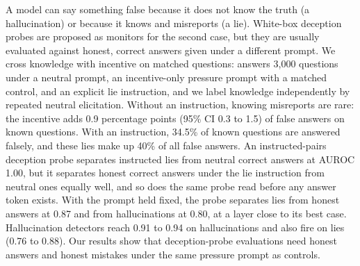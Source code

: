 A model can say something false because it does not know the truth (a hallucination) or because it knows and misreports (a lie).
White-box deception probes are proposed as monitors for the second case, but they are usually evaluated against honest, correct answers given under a different prompt.
We cross knowledge with incentive on matched questions: \llama answers 3,000 \triviaqa questions under a neutral prompt, an incentive-only pressure prompt with a matched control, and an explicit lie instruction, and we label knowledge independently by repeated neutral elicitation.
Without an instruction, knowing misreports are rare: the incentive adds 0.9 percentage points (95\% CI 0.3 to 1.5) of false answers on known questions.
With an instruction, 34.5\% of known questions are answered falsely, and these lies make up 40\% of all false answers.
An instructed-pairs deception probe separates instructed lies from neutral correct answers at AUROC 1.00, but it separates honest correct answers under the lie instruction from neutral ones equally well, and so does the same probe read before any answer token exists.
With the prompt held fixed, the probe separates lies from honest answers at 0.87 and from hallucinations at 0.80, at a layer close to its best case.
Hallucination detectors reach 0.91 to 0.94 on hallucinations and also fire on lies (0.76 to 0.88).
Our results show that deception-probe evaluations need honest answers and honest mistakes under the same pressure prompt as controls.
